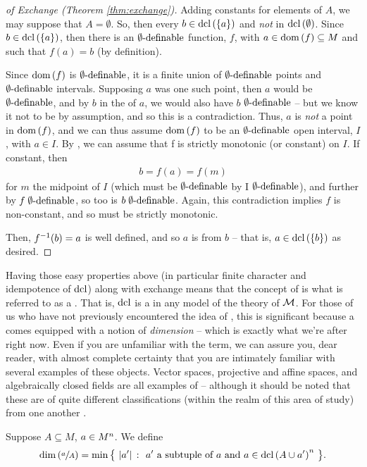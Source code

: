 \begin{proof}[of Exchange (Theorem \ref{thm:exchange})]
  Adding constants for elements of $A$, we may suppose that $A = \emptyset$. So, then every $b \in \dcl{\{a\}}$ and \emph{not} in $\dcl{\emptyset}$. Since $b \in \dcl{\{a\}}$, then there is an $\esdefnb$ function, $f$, with $a \in \dom{f} \subseteq M$ and such that $f(a) = b$ (by definition).

  Since $\dom{f}$ is $\esdefnb$, it is a finite union of $\esdefnb$ points and $\esdefnb$ intervals. Supposing $a$ was one such point, then $a$ would be $\esdefnb$, and by $b$ in the  of $a$, we would also have $b$ $\esdefnb$ -- but we know it not to be by assumption, and so this is a contradiction. Thus, $a$ is \emph{not} a point in $\dom{f}$, and we can thus assume $\dom{f}$ to be an $\esdefnb$ open interval, $I$, with $a \in I$. By \Mt, we can assume that f is strictly monotonic (or constant) on $I$. If constant, then
    \begin{align*}
      b = f(a) = f(m)
    \end{align*}
  for $m$ the midpoint of $I$ (which must be $\esdefnb$ by I $\esdefnb$), and further by $f \esdefnb$, so too is $b \esdefnb$. Again, this contradiction implies $f$ is non-constant, and so must be strictly monotonic.

  Then, $\inv{f}(b) = a$ is well defined, and so $a$ is  from $b$ -- that is, $a \in \dcl{\{b\}}$ as desired.
  \smartqed
\end{proof}

Having those easy properties above (in particular finite character and idempotence of $\dclop$) along with exchange means that the concept of  is what is referred to as a \emph{\pregeom}. That is, $\dclop$ is a \pregeom in any model of the theory of $\M$. For those of us who have not previously encountered the idea of \pregeoms, this is significant because a \pregeom comes equipped with a notion of \emph{dimension} -- which is exactly what we're after right now. Even if you are unfamiliar with the term, we can assure you, dear reader, with almost complete certainty that you are intimately familiar with several examples of these objects. Vector spaces, projective and affine spaces, and algebraically closed fields are all examples of \pregeoms -- although it should be noted that these are of quite different classifications (within the realm of this area of study) from one another \cite{pillay_geometric_1996}.

Suppose $A \subseteq M$, $\aMn[a]{n}$. We define
  \begin{align*}
    \dim{\sfrac{a}{A}} = \min{ \left\{ \ \card{\pri{a}} \ \colon \ \pri{a} \textrm{ a subtuple of } a \textrm{ and } a \in \dcl{A \cup \pri{a}}^n \ \right\} }.
  \end{align*}

